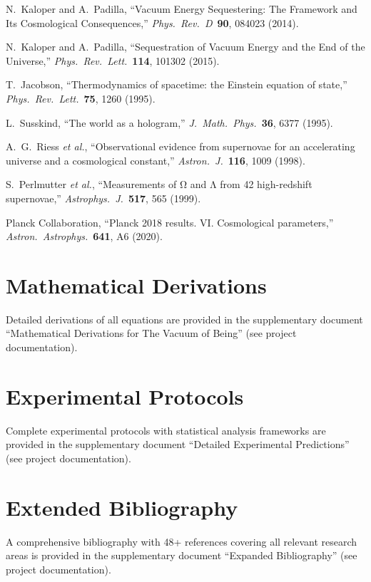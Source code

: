 \documentclass[12pt,a4paper]{article}
\begin{document}
\begin{thebibliography}{99}
 N.~Kaloper and A.~Padilla, ``Vacuum Energy Sequestering: The Framework and Its Cosmological Consequences,'' \textit{Phys.\ Rev.\ D}\ \textbf{90}, 084023 (2014).

 N.~Kaloper and A.~Padilla, ``Sequestration of Vacuum Energy and the End of the Universe,'' \textit{Phys.\ Rev.\ Lett.}\ \textbf{114}, 101302 (2015).

 T.~Jacobson, ``Thermodynamics of spacetime: the Einstein equation of state,'' \textit{Phys.\ Rev.\ Lett.}\ \textbf{75}, 1260 (1995).

 L.~Susskind, ``The world as a hologram,'' \textit{J.\ Math.\ Phys.}\ \textbf{36}, 6377 (1995).

 A.~G.~Riess \textit{et al.}, ``Observational evidence from supernovae for an accelerating universe and a cosmological constant,'' \textit{Astron.\ J.}\ \textbf{116}, 1009 (1998).

 S.~Perlmutter \textit{et al.}, ``Measurements of Ω and Λ from 42 high-redshift supernovae,'' \textit{Astrophys.\ J.}\ \textbf{517}, 565 (1999).

 Planck Collaboration, ``Planck 2018 results. VI. Cosmological parameters,'' \textit{Astron.\ Astrophys.}\ \textbf{641}, A6 (2020).

\end{thebibliography}

\appendix

\section{Mathematical Derivations}
\label{app:derivations}

Detailed derivations of all equations are provided in the supplementary document ``Mathematical Derivations for The Vacuum of Being'' (see project documentation).

\section{Experimental Protocols}
\label{app:experiments}

Complete experimental protocols with statistical analysis frameworks are provided in the supplementary document ``Detailed Experimental Predictions'' (see project documentation).

\section{Extended Bibliography}
\label{app:bibliography}

A comprehensive bibliography with 48+ references covering all relevant research areas is provided in the supplementary document ``Expanded Bibliography'' (see project documentation).
\end{document}
